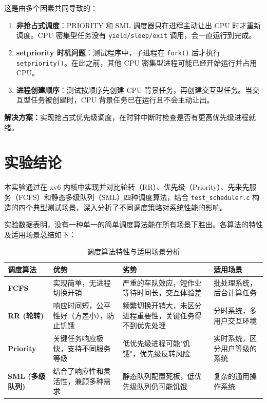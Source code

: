 \documentclass[a4paper, 12pt]{article}
\begin{document}
    这是由多个因素共同导致的：
    \begin{enumerate}
        \item \textbf{非抢占式调度}：PRIORITY 和 SML 调度器只在进程主动让出 CPU 时才重新调度。CPU 密集型任务没有 \texttt{yield/sleep/exit} 调用，会一直运行到完成。
        \item \textbf{setpriority 时机问题}：测试程序中，子进程在 \texttt{fork()} 后才执行 \texttt{setpriority()}。在此之前，其他 CPU 密集型进程可能已经开始运行并占用 CPU。
        \item \textbf{进程创建顺序}：测试按顺序先创建 CPU 背景任务，再创建交互型任务。当交互型任务被创建时，CPU 背景任务已在运行且不会主动让出。
    \end{enumerate}
    
    \textbf{解决方案：}实现抢占式优先级调度，在时钟中断时检查是否有更高优先级进程就绪。

    
    \section{实验结论}
    
    本实验通过在 xv6 内核中实现并对比轮转（RR）、优先级（Priority）、先来先服务（FCFS）和静态多级队列（SML）四种调度算法，结合 \texttt{test\_scheduler.c} 构造的四个典型测试场景，深入分析了不同调度策略对系统性能的影响。
    
    实验数据表明，没有一种单一的简单调度算法能在所有场景下胜出。各算法的特性及适用场景总结如下：
    
    \begin{table}[H]
        \centering
        \caption{调度算法特性与适用场景分析}
        \begin{tabular}{|p{2.5cm}|p{4cm}|p{4cm}|p{3.5cm}|}
            \hline
            \textbf{调度算法} & \textbf{优势} & \textbf{劣势} & \textbf{适用场景} \\ \hline
            \textbf{FCFS} & 实现简单，无进程切换开销 & 严重的车队效应，短作业等待时间长，交互体验差 & 批处理系统，后台计算任务 \\ \hline
            \textbf{RR (轮转)} & 响应时间短，公平性好（方差小），防止饥饿 & 频繁切换开销大，未区分进程重要性，关键任务得不到优先处理 & 分时系统，多用户交互环境 \\ \hline
            \textbf{Priority} & 关键任务响应极快，支持不同服务等级 & 低优先级进程可能"饥饿"，优先级反转风险 & 实时系统，区分用户等级的系统 \\ \hline
            \textbf{SML (多级队列)} & 结合了响应性和灵活性，兼顾多种需求 & 静态队列配置死板，低优先级队列仍可能饥饿 & 复杂的通用操作系统 \\ \hline
        \end{tabular}
    \end{table}
    
\end{document}
